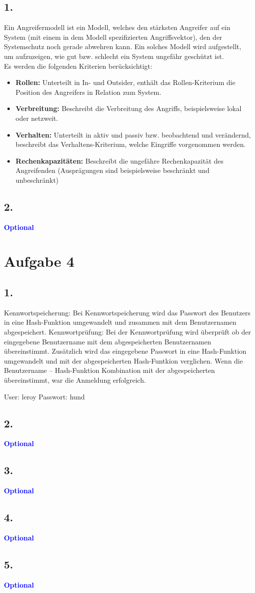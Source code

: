 \documentclass[a4paper,11pt]{scrartcl}
\newcommand{\opt}{\textcolor{blue}{\textbf{Optional}}}
\begin{document}
\subsection*{1.}
Ein Angreifermodell ist ein Modell, welches den stärksten Angreifer auf ein System (mit einem in dem 
Modell spezifizierten Angriffsvektor), den der Systemschutz noch gerade abwehren kann. Ein solches Modell 
wird aufgestellt, um aufzuzeigen, wie gut bzw. schlecht ein System ungefähr geschützt ist. \\
Es werden die folgenden Kriterien berücksichtigt:
\begin{itemize}
  \item \textbf{Rollen:} 
  Unterteilt in In- und Outsider, enthält das Rollen-Kriterium die Position des Angreifers in Relation zum
  System.
  \item \textbf{Verbreitung:} 
  Beschreibt die Verbreitung des Angriffs, beispielsweise lokal oder netzweit.
  \item \textbf{Verhalten:} 
  Unterteilt in aktiv und passiv bzw. beobachtend und verändernd, beschreibt das Verhaltens-Kriterium, welche Eingriffe vorgenommen werden.
  \item \textbf{Rechenkapazitäten:} 
  Beschreibt die ungefähre Rechenkapazität des Angreifenden (Ausprägungen sind beispielsweise beschränkt 
  und unbeschränkt)
\end{itemize}       

\subsection*{2.}
\opt

\section*{Aufgabe 4}
\subsection*{1.}
Kennwortspeicherung:
Bei Kennwortspeicherung wird das Passwort des Benutzers in eine Hash-Funktion umgewandelt und zusammen mit dem Benutzernamen abgespeichert.
Kennwortprüfung:
Bei der Kennwortprüfung wird überprüft ob der eingegebene Benutzername mit dem abgespeicherten Benutzernamen übereinstimmt. Zusätzlich wird das eingegebene Passwort in eine Hash-Funktion umgewandelt und mit der abgespeicherten Hash-Funtkion verglichen. Wenn die Benutzername – Hash-Funktion Kombination mit der abgespeicherten übereinstimmt, war die Anmeldung erfolgreich.

User: leroy
Passwort: hund
\subsection*{2.}
\opt
\subsection*{3.}
\opt
\subsection*{4.}
\opt
\subsection*{5.}
\opt
\end{document}
